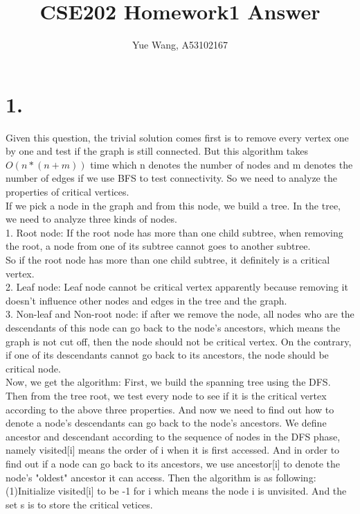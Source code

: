 \documentclass [11pt, a4paper, oneside] {article}
\author {Yue Wang, A53102167}
\title {CSE202 Homework1 Answer}
\begin{document}
\maketitle
\section *{1.}
Given this question, the trivial solution comes first is to remove every vertex one by one and test if the graph is still connected. But this algorithm takes $O(n*(n+m))$ time which
n denotes the number of nodes and m denotes the number of edges if we use BFS to test connectivity. So we need to analyze the properties of critical vertices.\\
If we pick a node in the graph and from this node, we build a tree. In the tree, we need to analyze three kinds of nodes.\\
1. Root node: If the root node has more than one child subtree, when removing the root, a node from one of its subtree cannot goes to another subtree. \\
So if the root node has more than one child subtree, it definitely is a critical vertex. \\
2. Leaf node: Leaf node cannot be critical vertex apparently because removing it doesn't influence other nodes and edges in the tree and the graph. \\
3. Non-leaf and Non-root node: if after we remove the node, all nodes who are the descendants of this node can go back to the node's ancestors, which means the graph is not cut off, then the node should not be critical vertex. On the contrary, if one of its descendants cannot go back to its ancestors, the node should be critical node.\\
Now, we get the algorithm: First, we build the spanning tree using the DFS. Then from the tree root, we test every node to see if it is the critical vertex according to the above three properties. And now we need to find out how to denote a node's descendants can go back to the node's ancestors. We define ancestor and descendant according to the sequence of nodes in the DFS phase, namely visited[i] means the order of i when it is first accessed. And in order to find out if a node can go back to its ancestors, we use ancestor[i] to denote the node's "oldest" ancestor it can access. Then the algorithm is as following:\\
(1)Initialize visited[i] to be -1 for i which means the node i is unvisited. And the set s is to store the critical vetices.\\
\end{document}
